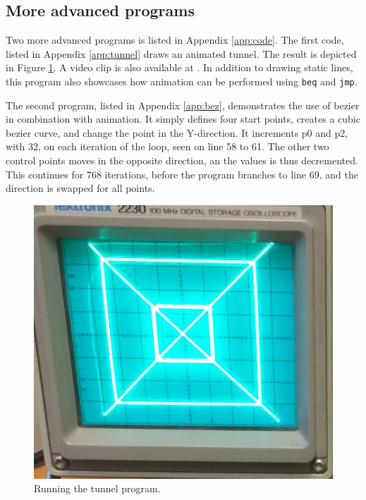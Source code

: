 \subsection{More advanced programs}
Two more advanced programs is listed in Appendix \ref{app:code}.
The first code, listed in Appendix \ref{app:tunnel} draws an animated tunnel.
The result is depicted in Figure \ref{fig:tunnel}.
A video clip is also available at \cite{tunnel-demo}.
In addition to drawing static lines, this program also showcases how animation can be performed using \texttt{beq} and \texttt{jmp}.

The second program, listed in Appendix \ref{app:bez}, demonstrates the use of bezier in combination with animation.
It simply defines four start points, creates a cubic bezier curve, and change the point in the Y-direction. It increments p0 and p2, with 32, on each iteration of the loop, seen on line 58 to 61.
The other two control points moves in the opposite direction, an the values is thus decremented. This continues for 768 iterations, before the program branches to line 69, and the direction is swapped for all points.

\begin{figure}[h]
	\centering
	\includegraphics[]{images/tunnel.jpg}
	\caption{Running the tunnel program.}
	\label{fig:tunnel}
\end{figure}
